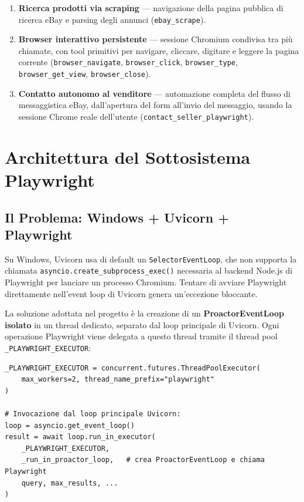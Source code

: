 \begin{enumerate}
    \item \textbf{Ricerca prodotti via scraping} — navigazione della
        pagina pubblica di ricerca eBay e parsing degli annunci
        (\texttt{ebay\_scrape}).
    \item \textbf{Browser interattivo persistente} — sessione Chromium
        condivisa tra più chiamate, con tool primitivi per navigare,
        cliccare, digitare e leggere la pagina corrente
        (\texttt{browser\_navigate}, \texttt{browser\_click},
        \texttt{browser\_type}, \texttt{browser\_get\_view},
        \texttt{browser\_close}).
    \item \textbf{Contatto autonomo al venditore} — automazione completa
        del flusso di messaggistica eBay, dall'apertura del form
        all'invio del messaggio, usando la sessione Chrome reale
        dell'utente (\texttt{contact\_seller\_playwright}).
\end{enumerate}


\section{Architettura del Sottosistema Playwright}
\label{sec:pw-arch}

\subsection{Il Problema: Windows + Uvicorn + Playwright}
\label{subsec:pw-eventloop}

Su Windows, Uvicorn usa di default un \texttt{SelectorEventLoop},
che non supporta la chiamata \texttt{asyncio.create\_subprocess\_exec()}
necessaria al backend Node.js di Playwright per lanciare un processo
Chromium. Tentare di avviare Playwright direttamente nell'event loop di
Uvicorn genera un'eccezione bloccante.

La soluzione adottata nel progetto è la creazione di un
\textbf{ProactorEventLoop isolato} in un thread dedicato, separato
dal loop principale di Uvicorn. Ogni operazione Playwright viene
delegata a questo thread tramite il thread pool
\texttt{\_PLAYWRIGHT\_EXECUTOR}:

\begin{verbatim}
_PLAYWRIGHT_EXECUTOR = concurrent.futures.ThreadPoolExecutor(
    max_workers=2, thread_name_prefix="playwright"
)

# Invocazione dal loop principale Uvicorn:
loop = asyncio.get_event_loop()
result = await loop.run_in_executor(
    _PLAYWRIGHT_EXECUTOR,
    _run_in_proactor_loop,   # crea ProactorEventLoop e chiama Playwright
    query, max_results, ...
)
\end{verbatim}


